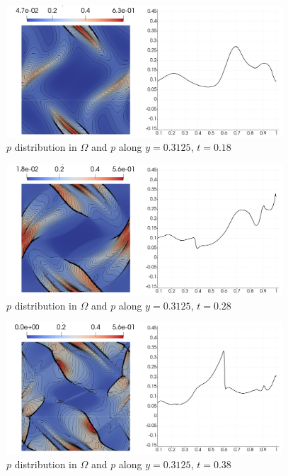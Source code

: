 \begin{figure}[H]
	\centering
	\includegraphics[width=0.92\textwidth]{img/ot/my2new.jpg}
\vspace{-2mm}
\caption{$p$ distribution in $\Omega$ and $p$ along $y = 0.3125$, $t = 0.18$}
\label{figure:myOt2}
\end{figure}
\vspace{-4mm}

\begin{figure}[H]
	\centering
	\includegraphics[width=0.92\textwidth]{img/ot/my3new.jpg}
\vspace{-2mm}
\caption{$p$ distribution in $\Omega$ and $p$ along $y = 0.3125$, $t = 0.28$}
\label{figure:myOt3}
\end{figure}
\vspace{-4mm}

\begin{figure}[H]
	\centering
	\includegraphics[width=0.92\textwidth]{img/ot/my4new.jpg}
\vspace{-2mm}
\caption{$p$ distribution in $\Omega$ and $p$ along $y = 0.3125$, $t = 0.38$}
\label{figure:myOt4}
\end{figure}
\vspace{-4mm}

